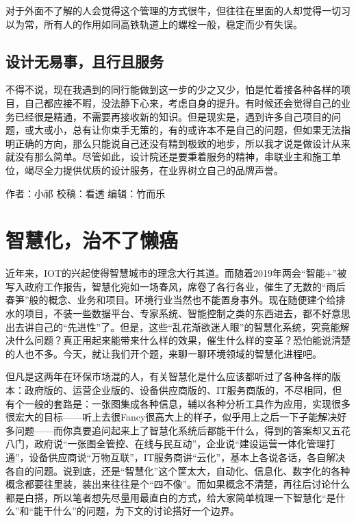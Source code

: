 \documentclass[]{book}
\begin{document}
对于外面不了解的人会觉得这个管理的方式很牛，但往往在里面的人却觉得一切习以为常，所有人的作用如同高铁轨道上的螺栓一般，稳定而少有失误。

\hypertarget{ux8bbeux8ba1ux65e0ux6613ux4e8bux4e14ux884cux4e14ux670dux52a1}{%
\subsection{设计无易事，且行且服务}\label{ux8bbeux8ba1ux65e0ux6613ux4e8bux4e14ux884cux4e14ux670dux52a1}}

不得不说，现在我遇到的同行能做到这一步的少之又少，怕是忙着接各种各样的项目，自己都应接不暇，没法静下心来，考虑自身的提升。有时候还会觉得自己的业务已经很是精通，不需要再接收新的知识。但是现实是，遇到许多自己项目的问题，或大或小，总有让你束手无策的，有的或许本不是自己的问题，但如果无法指明正确的方向，那么只能说自己还没有精到极致的地步，所以我才说是做设计从来就没有那么简单。尽管如此，设计院还是要秉着服务的精神，串联业主和施工单位，竭尽全力提供优质的设计服务，在业界树立自己的品牌声誉。

作者：小祁
校稿：看透
编辑：竹而乐

\hypertarget{ux667aux6167ux5316ux6cbbux4e0dux4e86ux61d2ux764c}{%
\section{智慧化，治不了懒癌}\label{ux667aux6167ux5316ux6cbbux4e0dux4e86ux61d2ux764c}}

近年来，IOT的兴起使得智慧城市的理念大行其道。而随着2019年两会``智能+''被写入政府工作报告，智慧化宛如一场春风，席卷了各行各业，催生了无数的``雨后春笋''般的概念、业务和项目。环境行业当然也不能置身事外。现在随便建个给排水的项目，不装一些数据平台、专家系统、智能控制之类的东西进去，都不好意思出去讲自己的``先进性''了。但是，这些``乱花渐欲迷人眼''的智慧化系统，究竟能解决什么问题？真正用起来能带来什么样的效果，催生什么样的变革？恐怕能说清楚的人也不多。今天，就让我们开个题，来聊一聊环境领域的智慧化进程吧。

但凡是这两年在环保市场混的人，有关智慧化是什么应该都听过了各种各样的版本：政府版的、运营企业版的、设备供应商版的、IT服务商版的，不尽相同，但有个一般的套路是：一张图集成各种信息，辅以各种分析工具作为应用，实现很多很宏大的目标------听上去很Fancy很高大上的样子，似乎用上之后一下子能解决好多问题------而你真要追问起来上了智慧化系统后都能干什么，得到的答案却又五花八门，政府说``一张图全管控、在线与民互动''，企业说``建设运营一体化管理打通''，设备供应商说``万物互联''，IT服务商讲``云化''，基本上各说各话，各自解决各自的问题。说到底，还是``智慧化''这个筐太大，自动化、信息化、数字化的各种概念都要往里装，装出来往往是个``四不像''。而如果概念不清楚，再往后讨论什么都是白搭，所以笔者想先尽量用最直白的方式，给大家简单梳理一下智慧化``是什么''和``能干什么''的问题，为下文的讨论搭好一个边界。
\end{document}
